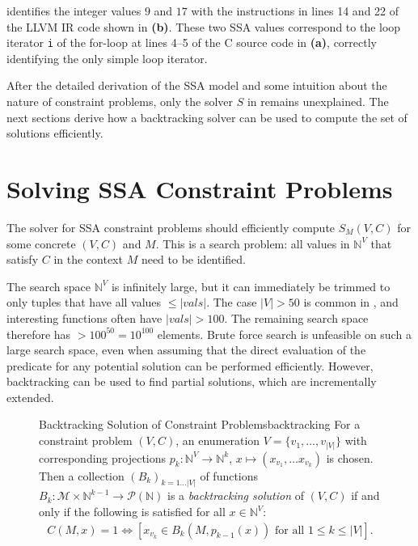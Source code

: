      identifies the integer values $9$ and $17$ with the
    instructions in lines 14 and 22 of the LLVM IR code shown in
     {\bf(b)}.
    These two SSA values correspond to the loop iterator \texttt{i} of the
    for-loop at lines 4--5 of the C source code in
     {\bf(a)}, correctly identifying the only simple loop
    iterator.

    After the detailed derivation of the SSA model and some intuition about the
    nature of constraint problems, only the solver $S$ in
     remains unexplained.
    The next sections derive how a backtracking solver can be used to
    compute the set of solutions efficiently.

\section{Solving SSA Constraint Problems}
\label{sec:constraintsolving}

    The solver for SSA constraint problems should efficiently compute $S_M(V,C)$
    for some concrete $(V,C)$ and $M$.
    This is a search problem:
    all values in $\mathbb N^V$ that satisfy $C$ in the context $M$ need to be
    identified.

    The search space $\mathbb N^V$ is infinitely large, but it can immediately
    be trimmed to only tuples that have all values $\leq|vals|$.
    The case \mbox{$|V|>50$} is common in
    , and interesting
    functions often have \mbox{$|vals|>100$}.
    The remaining search space therefore has $>100^{50}=10^{100}$ elements.
    Brute force search is unfeasible on such a large search space, even when assuming
    that the direct evaluation of the predicate for any potential solution can
    be performed efficiently.
    However, backtracking can be used to find partial solutions, which are
    incrementally extended.

\begin{figure}[h]
    \begin{definition}{Backtracking Solution of Constraint Problems}{backtracking}
        For a constraint problem $(V,C)$, an enumeration
        $V=\{v_1,\dots,v_{|V|}\}$ with corresponding projections
        $p_k\colon\mathbb N^V\rightarrow\mathbb N^k$,
        $x\mapsto(x_{v_1},\dots x_{v_k})$ is chosen.
        Then a collection $(B_k)_{k=1\dots |V|}$ of functions
        $B_k:\mathcal M\times \mathbb N^{k-1}\rightarrow\mathcal P(\mathbb N)$
        is a {\em backtracking solution} of $(V,C)$ if and only if the following
        is satisfied for all $x\in\mathbb N^V$:
        \begin{align}
            C(M,x)=1\iff\left[x_{v_k}\in B_k(M,p_{k-1}(x))\text{ for all }1\leq k\leq |V|\right].
        \end{align}
    \end{definition}
\end{figure}

